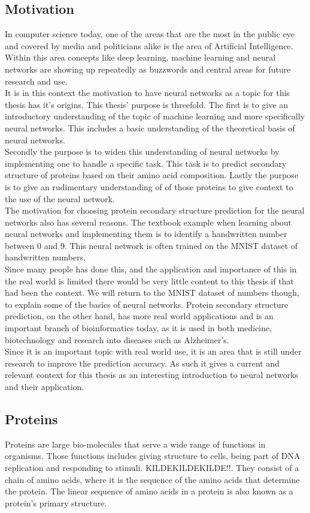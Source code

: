 \subsection{Motivation}
In computer science today, one of the areas that are the most in the public eye and covered by media and politicians alike is the area of Artificial Intelligence. Within this area concepts like deep learning, machine learning and neural networks are showing up repeatedly as buzzwords and central areas for future research and use.\\
It is in this context the motivation to have neural networks as a topic for this thesis has it's origins. This thesis' purpose is threefold. The first is to give an introductory understanding of the topic of machine learning and more specifically neural networks. This includes a basic understanding of the theoretical basis of neural networks. \\
Secondly the purpose is to widen this understanding of neural networks by implementing one to handle a specific task. This task is to predict secondary structure of proteins based on their amino acid composition. Lastly the purpose is to give an rudimentary understanding of of those proteins to give context to the use of the neural network.\\
The motivation for choosing protein secondary structure prediction for the neural networks also has several reasons. 
The textbook example when learning about neural networks and implementing them is to identify a handwritten number between 0 and 9. This neural network is often trained on the MNIST dataset of handwritten numbers. \\
Since many people has done this, and the application and importance of this in the real world is limited there would be very little content to this thesis if that had been the context. We will return to the MNIST dataset of numbers though, to explain some of the basics of neural networks. Protein secondary structure prediction, on the other hand, has more real world applications and is an important branch of bioinformatics today, as it is used in both medicine, biotechnology and research into diseases such as Alzheimer's. \\
Since it is an important topic with real world use, it is an area that is still under research to improve the prediction accuracy. As such it gives a current and relevant context for this thesis as an interesting introduction to neural networks and their application.   


\subsection{Proteins}
Proteins are large bio-molecules that serve a wide range of functions in organisms. Those functions includes giving structure to cells, being part of DNA replication and responding to stimuli. KILDEKILDEKILDE!!. They consist of a chain of amino acids, where it is the sequence of the amino acids that determine the protein. The linear sequence of amino acids in a protein is also known as a protein's primary structure. 


